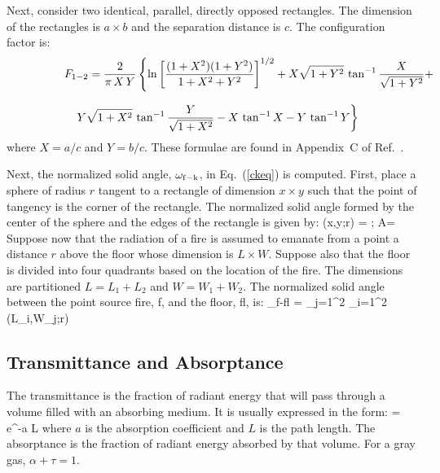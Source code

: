 \documentclass[12pt]{book}
\begin{document}
Next, consider two identical, parallel, directly opposed rectangles. The dimension of the rectangles is $a \times b$ and the separation distance is $c$. The configuration factor is:
\begin{eqnarray}
\lefteqn{F_{1-2} = \frac{2}{\pi \, X \, Y} \left\{ \ln \left[ \frac{(1+X^2)(1+Y^2)}{1+X^2+Y^2} \right]^{1/2} + X \sqrt{1+Y^2} \, \tan^{-1} \frac{X}{\sqrt{1+Y^2}} + \right.} \nonumber \\[.1in]
& & \left. Y \sqrt{1+X^2} \, \tan^{-1} \frac{Y}{\sqrt{1+X^2}} - X \, \tan^{-1} X - Y\, \tan^{-1} Y \right\}
\end{eqnarray}
where $X=a/c$ and $Y=b/c$. These formulae are found in Appendix~C of Ref.~\cite{SiegelandHowell:1981}.

Next, the normalized solid angle, $\omega_{\rm f-k}$, in Eq.~(\ref{ckeq}) is computed. First, place a sphere of radius $r$ tangent to a rectangle of dimension $x \times y$ such that the point of tangency is the corner of the rectangle. The normalized solid angle formed by the center of the sphere and the edges of the rectangle is given by:
\be
   \omega(x,y;r) =   \quad ; \quad A=
\ee
Suppose now that the radiation of a fire is assumed to emanate from a point a distance $r$ above the floor whose dimension is $L \times W$. Suppose also that the floor is divided into four quadrants based on the location of the fire. The dimensions are partitioned $L=L_1+L_2$ and $W=W_1+W_2$. The normalized solid angle between the point source fire, f, and the floor, fl, is:
\be
   \omega_{\rm f-fl} = \sum_{j=1}^2 \sum_{i=1}^2 \omega(L_i,W_j;r)
\ee

\subsection{Transmittance and Absorptance}

The transmittance is the fraction of radiant energy that will pass through a volume filled with an absorbing medium. It is usually expressed in the form:
\be
   \tau = {\rm e}^{-a L}
\ee
where $a$ is the absorption coefficient and $L$ is the path length. The absorptance is the fraction of radiant energy absorbed by that volume. For a gray gas, $\alpha + \tau = 1$.
\end{document}
